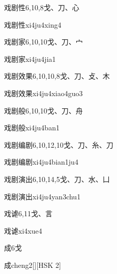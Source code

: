 \begin{entry}{戏剧性}{6,10,8}{⼽、⼑、⼼}
  \begin{phonetics}{戏剧性}{xi4ju4xing4}
  \end{phonetics}
\end{entry}

\begin{entry}{戏剧家}{6,10,10}{⼽、⼑、⼧}
  \begin{phonetics}{戏剧家}{xi4ju4jia1}
  \end{phonetics}
\end{entry}

\begin{entry}{戏剧效果}{6,10,10,8}{⼽、⼑、⽁、⽊}
  \begin{phonetics}{戏剧效果}{xi4ju4xiao4guo3}
  \end{phonetics}
\end{entry}

\begin{entry}{戏剧般}{6,10,10}{⼽、⼑、⾈}
  \begin{phonetics}{戏剧般}{xi4ju4ban1}
  \end{phonetics}
\end{entry}

\begin{entry}{戏剧编剧}{6,10,12,10}{⼽、⼑、⽷、⼑}
  \begin{phonetics}{戏剧编剧}{xi4ju4bian1ju4}
  \end{phonetics}
\end{entry}

\begin{entry}{戏剧演出}{6,10,14,5}{⼽、⼑、⽔、⼐}
  \begin{phonetics}{戏剧演出}{xi4ju4yan3chu1}
  \end{phonetics}
\end{entry}

\begin{entry}{戏谑}{6,11}{⼽、⾔}
  \begin{phonetics}{戏谑}{xi4xue4}
  \end{phonetics}
\end{entry}

\begin{entry}{成}{6}{⼽}
  \begin{phonetics}{成}{cheng2}[][HSK 2]
  \end{phonetics}
\end{entry}

